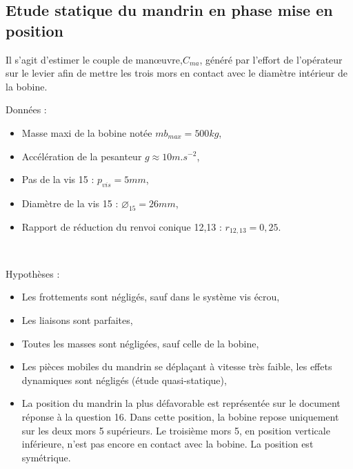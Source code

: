 \subsection{Etude statique du mandrin en phase \og mise en position \fg}

Il s'agit d'estimer le couple de man\oe uvre,$C_{ma}$, généré par l'effort de l'opérateur sur le levier afin
de mettre les trois mors en contact avec le diamètre intérieur de la bobine.

Données :
\begin{itemize}
 \item Masse maxi de la bobine notée $mb_{max}=500kg$,
 \item Accélération de la pesanteur $g\approx 10 m.s^{-2}$,
 \item Pas de la vis 15 : $p_{vis}=5mm$,
 \item Diamètre de la vis 15 : $\varnothing_{15}=26mm$,
 \item Rapport de réduction du renvoi conique {12,13} : $r_{12,13}=0,25$.
\end{itemize}

~\

Hypothèses :
\begin{itemize}
 \item Les frottements sont négligés, sauf dans le système vis écrou,
 \item Les liaisons sont parfaites,
 \item Toutes les masses sont négligées, sauf celle de la bobine,
 \item Les pièces mobiles du mandrin se déplaçant à vitesse très faible, les effets dynamiques
sont négligés (étude quasi-statique),
 \item La position du mandrin la plus défavorable est représentée sur le document réponse à la question 16. Dans cette position, la bobine repose uniquement sur les deux mors 5 supérieurs. Le troisième mors 5, en position verticale inférieure, n'est pas encore en contact avec la bobine. La position est symétrique.
\end{itemize}


